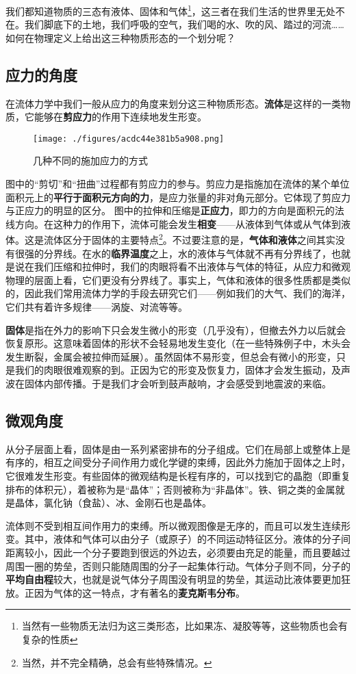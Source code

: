 
我们都知道物质的三态有液体、固体和气体\footnote{当然有一些物质无法归为这三类形态，比如果冻、凝胶等等，这些物质也会有复杂的性质}，这三者在我们生活的世界里无处不在。我们脚底下的土地，我们呼吸的空气，我们喝的水、吹的风、踏过的河流…… 如何在物理定义上给出这三种物质形态的一个划分呢？

\subsection{应力的角度}
在流体力学中我们一般从应力的角度来划分这三种物质形态。\textbf{流体}是这样的一类物质，它能够在\textbf{剪应力}的作用下连续地发生形变。

\begin{figure}[ht]
\centering
\texttt{[image: ./figures/acdc44e381b5a908.png]}
\caption{几种不同的施加应力的方式} \label{fig_SLG_1}
\end{figure}

图中的“剪切”和“扭曲”过程都有剪应力的参与。剪应力是指施加在流体的某个单位面积元上的\textbf{平行于面积元方向的力}，是应力张量的非对角元部分。它体现了剪应力与正应力的明显的区分。
图中的拉伸和压缩是\textbf{正应力}，即力的方向是面积元的法线方向。在这种力的作用下，流体可能会发生\textbf{相变}——从液体到气体或从气体到液体。这是流体区分于固体的主要特点\footnote{当然，并不完全精确，总会有些特殊情况。}。不过要注意的是，\textbf{气体和液体}之间其实没有很强的分界线。在水的\textbf{临界温度}之上，水的液体与气体就不再有分界线了，也就是说在我们压缩和拉伸时，我们的肉眼将看不出液体与气体的特征，从应力和微观物理的层面上看，它们更没有分界线了。事实上，气体和液体的很多性质都是类似的，因此我们常用流体力学的手段去研究它们——例如我们的大气、我们的海洋，它们共有着许多规律——涡旋、对流等等。

\textbf{固体}是指在外力的影响下只会发生微小的形变（几乎没有），但撤去外力以后就会恢复原形。这意味着固体的形状不会轻易地发生变化（在一些特殊例子中，木头会发生断裂，金属会被拉伸而延展）。虽然固体不易形变，但总会有微小的形变，只是我们的肉眼很难观察的到。正因为它的形变及恢复力，固体才会发生振动，及声波在固体内部传播。于是我们才会听到鼓声敲响，才会感受到地震波的来临。

\subsection{微观角度}
从分子层面上看，固体是由一系列紧密排布的分子组成。它们在局部上或整体上是有序的，相互之间受分子间作用力或化学键的束缚，因此外力施加于固体之上时，它很难发生形变。有些固体的微观结构是长程有序的，可以找到它的晶胞（即重复排布的体积元），着被称为是“晶体”；否则被称为“非晶体”。铁、铜之类的金属就是晶体，氯化钠（食盐）、冰、金刚石也是晶体。

流体则不受到相互间作用力的束缚。所以微观图像是无序的，而且可以发生连续形变。其中，液体和气体可以由分子（或原子）的不同运动特征区分。液体的分子间距离较小，因此一个分子要跑到很远的外边去，必须要由充足的能量，而且要越过周围一圈的势垒，否则只能随周围的分子一起集体行动。气体分子则不同，分子的\textbf{平均自由程}较大，也就是说气体分子周围没有明显的势垒，其运动比液体要更加狂放。正因为气体的这一特点，才有著名的\textbf{麦克斯韦分布}。
